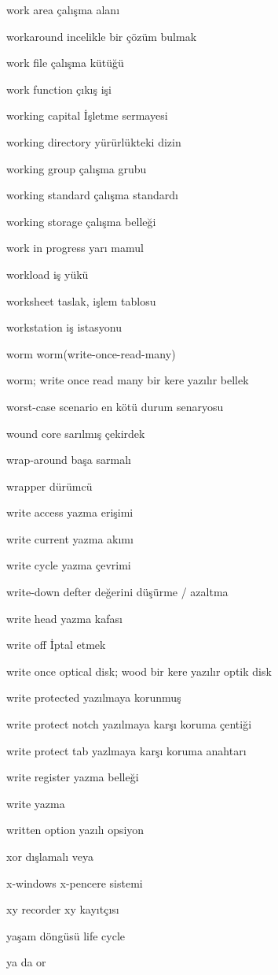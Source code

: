 \documentclass[12pt,fleqn]{article}\usepackage{../../common}
\begin{document}
work area çalışma alanı

workaround incelikle bir çözüm bulmak

work file çalışma kütüğü

work function çıkış işi

working capital İşletme sermayesi

working directory yürürlükteki dizin

working group çalışma grubu

working standard çalışma standardı

working storage çalışma belleği

work in progress yarı mamul

workload iş yükü

worksheet taslak, işlem tablosu

workstation iş istasyonu

worm worm(write-once-read-many)

worm; write once read many bir kere yazılır bellek

worst-case scenario en kötü durum senaryosu

wound core sarılmış çekirdek

wrap-around başa sarmalı

wrapper dürümcü

write access yazma erişimi

write current yazma akımı

write cycle yazma çevrimi

write-down defter değerini düşürme / azaltma

write head yazma kafası

write off İptal etmek

write once optical disk; wood bir kere yazılır optik disk

write protected yazılmaya korunmuş

write protect notch yazılmaya karşı koruma çentiği

write protect tab yazlmaya karşı koruma anahtarı

write register yazma belleği

write yazma

written option yazılı opsiyon

xor dışlamalı veya

x-windows x-pencere sistemi

xy recorder xy kayıtçısı

yaşam döngüsü life cycle

ya da or
\end{document}
